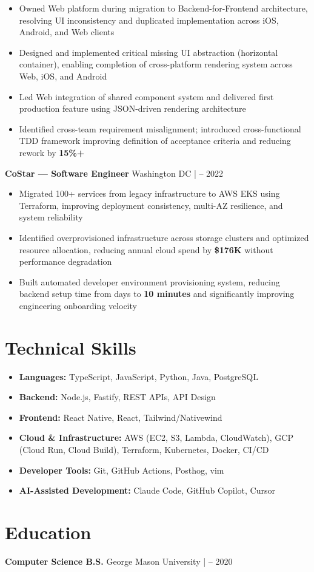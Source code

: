 \documentclass[letterpaper,11pt]{article}
\begin{document}
\begin{itemize}[leftmargin=*]
\item Owned Web platform during migration to Backend-for-Frontend architecture, resolving UI inconsistency and duplicated implementation across iOS, Android, and Web clients
\item Designed and implemented critical missing UI abstraction (horizontal container), enabling completion of cross-platform rendering system across Web, iOS, and Android
\item Led Web integration of shared component system and delivered first production feature using JSON-driven rendering architecture
\item Identified cross-team requirement misalignment; introduced cross-functional TDD framework improving definition of acceptance criteria and reducing rework by \textbf{15\%+}
\end{itemize}

\vspace{2pt}

\noindent\textbf{CoStar — Software Engineer} \hfill Washington DC \quad |  – 2022

\begin{itemize}[leftmargin=*]
\item Migrated 100+ services from legacy infrastructure to AWS EKS using Terraform, improving deployment consistency, multi-AZ resilience, and system reliability
\item Identified overprovisioned infrastructure across storage clusters and optimized resource allocation, reducing annual cloud spend by \textbf{\$176K} without performance degradation
\item Built automated developer environment provisioning system, reducing backend setup time from days to \textbf{10 minutes} and significantly improving engineering onboarding velocity
\end{itemize}

\section*{Technical Skills}

\begin{itemize}[leftmargin=*]
\item \textbf{Languages:} TypeScript, JavaScript, Python, Java, PostgreSQL
\item \textbf{Backend:} Node.js, Fastify, REST APIs, API Design
\item \textbf{Frontend:} React Native, React, Tailwind/Nativewind
\item \textbf{Cloud \& Infrastructure:} AWS (EC2, S3, Lambda, CloudWatch), GCP (Cloud Run, Cloud Build), Terraform, Kubernetes, Docker, CI/CD
\item \textbf{Developer Tools:} Git, GitHub Actions, Posthog, vim
\item \textbf{AI-Assisted Development:} Claude Code, GitHub Copilot, Cursor
\end{itemize}

\section*{Education}
\textbf{Computer Science B.S.} \hfill George Mason University \quad |  – 2020
\end{document}
